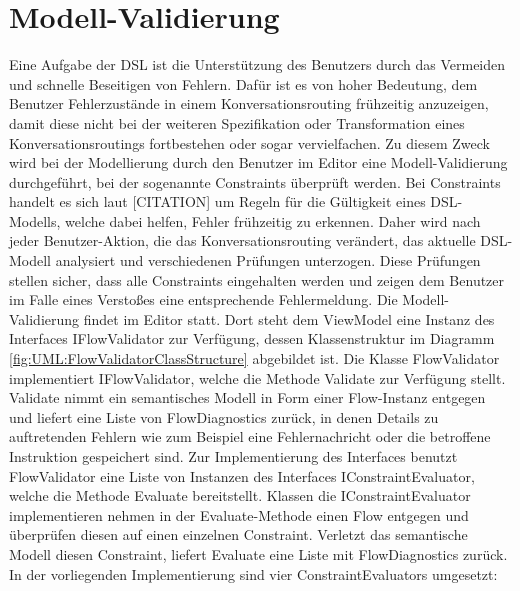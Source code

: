 \section{Modell-Validierung} 
Eine Aufgabe der DSL ist die Unterstützung des Benutzers durch das Vermeiden und schnelle Beseitigen von Fehlern. Dafür ist es von hoher Bedeutung, dem Benutzer Fehlerzustände in einem Konversationsrouting frühzeitig anzuzeigen, damit diese nicht bei der weiteren Spezifikation oder Transformation eines Konversationsroutings fortbestehen oder sogar vervielfachen. Zu diesem Zweck wird bei der Modellierung durch den Benutzer im Editor eine Modell-Validierung durchgeführt, bei der sogenannte Constraints überprüft werden. Bei Constraints handelt es sich laut [CITATION] um Regeln für die Gültigkeit eines DSL-Modells, welche dabei helfen, Fehler frühzeitig zu erkennen. Daher wird nach jeder Benutzer-Aktion, die das Konversationsrouting verändert, das aktuelle DSL-Modell analysiert und verschiedenen Prüfungen unterzogen. Diese Prüfungen stellen sicher, dass alle Constraints eingehalten werden und zeigen dem Benutzer im Falle eines Verstoßes eine entsprechende Fehlermeldung.
\newline
Die Modell-Validierung findet im Editor statt. Dort steht dem ViewModel eine Instanz des Interfaces IFlowValidator zur Verfügung, dessen Klassenstruktur im Diagramm \ref{fig:UML:FlowValidatorClassStructure} abgebildet ist. Die Klasse FlowValidator implementiert IFlowValidator, welche die Methode Validate zur Verfügung stellt. Validate nimmt ein semantisches Modell in Form einer Flow-Instanz entgegen und liefert eine Liste von FlowDiagnostics zurück, in denen Details zu auftretenden Fehlern wie zum Beispiel eine Fehlernachricht oder die betroffene Instruktion gespeichert sind. Zur Implementierung des Interfaces benutzt FlowValidator eine Liste von Instanzen des Interfaces IConstraintEvaluator, welche die Methode Evaluate bereitstellt. Klassen die IConstraintEvaluator implementieren nehmen in der Evaluate-Methode einen Flow entgegen und überprüfen diesen auf einen einzelnen Constraint. Verletzt das semantische Modell diesen Constraint, liefert Evaluate eine Liste mit FlowDiagnostics zurück. In der vorliegenden Implementierung sind vier ConstraintEvaluators umgesetzt: 
